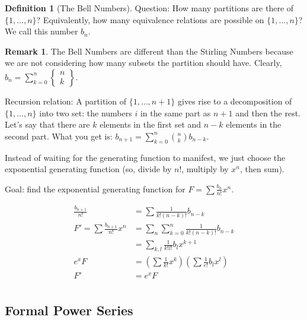 \documentclass[12pt]{article}
\theoremstyle{definition}
\newtheorem{defn}{Definition}
\newtheorem{remark}{Remark}
\begin{document}
\begin{defn}[The Bell Numbers]
Question: How many partitions are there of $\{1, \ldots, n\}$? Equivalently,
how many equivalence relations are possible on $\{1, \ldots, n\}$? We call this
number $b_n$.
\end{defn}

\begin{remark}
The Bell Numbers are different than the Stirling Numbers because we are not
considering how many subsets the partition should have. Clearly, $b_n =
\sum_{k=0}^n \begin{Bmatrix} n \\ k \end{Bmatrix}$.
\end{remark}

Recursion relation: A partition of $\{1, \ldots, n + 1\}$ gives rise to a
decomposition of $\{1, \ldots, n\}$ into two set: the numbers $i$ in the same
part as $n + 1$ and then the rest. Let's say that there are $k$ elements in the
first set and $n - k$ elements in the second part. What you get is: $b_{n+1} =
\sum_{k=0}^n {n \choose k} b_{n-k}$.

Instead of waiting for the generating function to manifest, we just choose the
exponential generating function (so, divide by $n!$, multiply by $x^n$, then
sum).

Goal: find the exponential generating function for $F = \sum \frac{b_n}{n!}x^n$.

\begin{align*}
    \frac{b_{n+1}}{n!} &= \sum \frac{1}{k!(n-k)!} b_{n-k} \\
    F' = \sum \frac{b_{n+1}}{n!} x^n &= \sum_n \sum_{k=0}^n  \frac{1}{k!(n-k)!} b_{n-k} \\
    &= \sum_{k, l} \frac{1}{k!l!} b_l x^{k+1} \\
    e^xF &= \left(\sum \frac{1}{k!}x^k\right)\left(\sum \frac{1}{e!}b_lx^l\right) \\
    F' &= e^xF \\
\end{align*}

\subsection{Formal Power Series}
\end{document}

